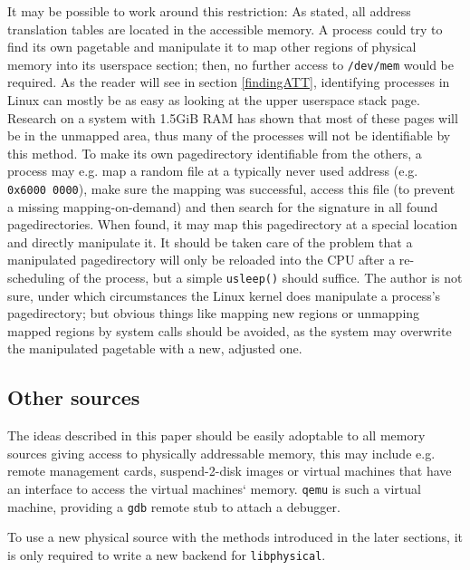It may be possible to work around this restriction: As stated, all address
translation tables are located in the accessible memory. A process could try to
find its own pagetable and manipulate it to map other regions of physical memory
into its userspace section; then, no further access to \texttt{/dev/mem} would
be required. As the reader will see in section \ref{findingATT}, identifying
processes in Linux can mostly be as easy as looking at the upper userspace stack
page.  Research on a system with 1.5GiB RAM has shown that most of these pages
will be in the unmapped area, thus many of the processes will not be
identifiable by this method. To make its own pagedirectory identifiable from the
others, a process may e.g. map a random file at a typically never used address
(e.g.  \texttt{0x6000~0000}), make sure the mapping was successful, access this
file (to prevent a missing mapping-on-demand) and then search for the signature
in all found pagedirectories. When found, it may map this pagedirectory at a
special location and directly manipulate it. It should be taken care of the
problem that a manipulated pagedirectory will only be reloaded into the CPU
after a re-scheduling of the process, but a simple \texttt{usleep()} should
suffice. The author is not sure, under which circumstances the Linux kernel does
manipulate a process's pagedirectory; but obvious things like mapping new
regions or unmapping mapped regions by system calls should be avoided, as the
system may overwrite the manipulated pagetable with a new, adjusted one.



\subsection{Other sources}

The ideas described in this paper should be easily adoptable to all memory
sources giving access to physically addressable memory, this may include e.g.
remote management cards, suspend-2-disk images or virtual machines that have an
interface to access the virtual machines` memory.  \texttt{qemu} is such a
virtual machine, providing a \texttt{gdb} remote stub to attach a debugger.

To use a new physical source with the methods introduced in the later sections,
it is only required to write a new backend for \texttt{libphysical}.

